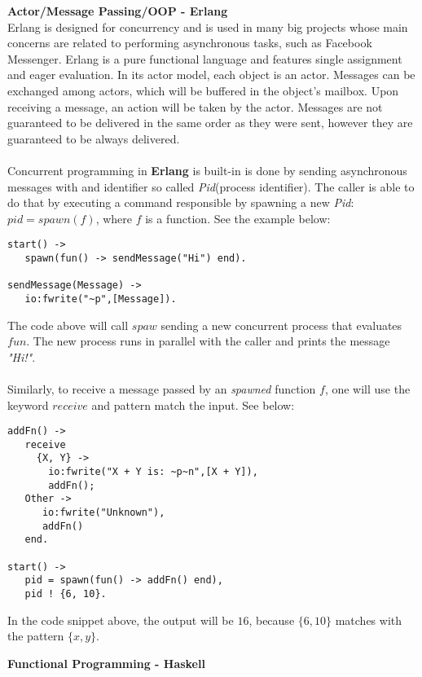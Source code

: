\documentclass[conference]{IEEEtran}
\begin{document}
\textbf{ Actor/Message Passing/OOP - Erlang } \\
Erlang is designed for concurrency and is used in many big projects whose main concerns are related to performing asynchronous tasks, such as Facebook Messenger. Erlang is a pure functional language and features single assignment and eager evaluation. In its actor model, each object is an actor. Messages can be exchanged among actors, which will be buffered in the object's mailbox. Upon receiving a message, an action will be taken by the actor. Messages are not guaranteed to be delivered in the same order as they were sent, however they are guaranteed to be always delivered.
\\\\
Concurrent programming in \textbf{Erlang} is built-in is done by sending asynchronous messages with and identifier so called \textit{Pid}(process identifier). The caller is able to do that by executing a command responsible by spawning a new \textit{Pid}: $pid = spawn(f)$, where $f$ is a function. See the example below:
\lstset{language=erlang}
\begin{lstlisting}[frame=single]
start() ->
   spawn(fun() -> sendMessage("Hi") end). 

sendMessage(Message) ->
   io:fwrite("~p",[Message]).
\end{lstlisting}

The code above will call $spaw$ sending a new concurrent process that evaluates $fun$. The new process runs in parallel with the caller and prints the message \textit{"Hi!"}. 
\\\\
Similarly, to receive a message passed by an \textit{spawned} function $f$, one will use the keyword $receive$ and pattern match the input. See below: 
\begin{lstlisting}[frame=single]
addFn() ->
   receive 
     {X, Y} -> 
       io:fwrite("X + Y is: ~p~n",[X + Y]), 
       addFn(); 
   Other ->
      io:fwrite("Unknown"), 
      addFn() 
   end. 

start() ->
   pid = spawn(fun() -> addFn() end), 
   pid ! {6, 10}.
\end{lstlisting}

In the code snippet above, the output will be $16$, because $\{6, 10\}$ matches with the pattern $\{x,y\}$.

\hfill

\textbf{ Functional Programming - Haskell }
\end{document}
